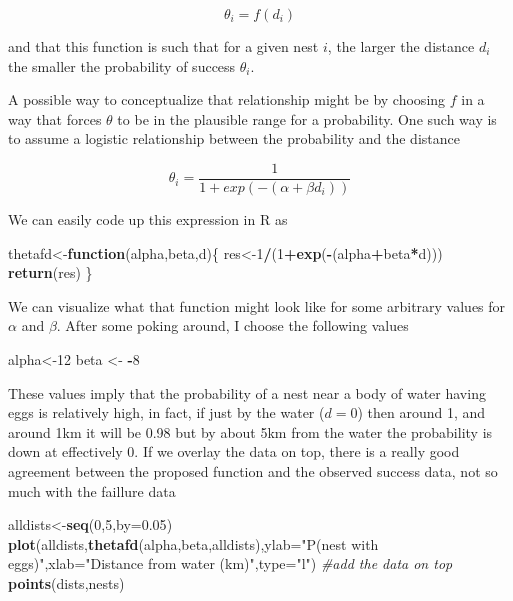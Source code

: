 \documentclass[
]{book}
\newenvironment{Shaded}{\begin{snugshade}}{\end{snugshade}}
\newcommand{\AttributeTok}[1]{\textcolor[rgb]{0.13,0.29,0.53}{#1}}
\newcommand{\CommentTok}[1]{\textcolor[rgb]{0.56,0.35,0.01}{\textit{#1}}}
\newcommand{\ControlFlowTok}[1]{\textcolor[rgb]{0.13,0.29,0.53}{\textbf{#1}}}
\newcommand{\DecValTok}[1]{\textcolor[rgb]{0.00,0.00,0.81}{#1}}
\newcommand{\FloatTok}[1]{\textcolor[rgb]{0.00,0.00,0.81}{#1}}
\newcommand{\FunctionTok}[1]{\textcolor[rgb]{0.13,0.29,0.53}{\textbf{#1}}}
\newcommand{\NormalTok}[1]{#1}
\newcommand{\OtherTok}[1]{\textcolor[rgb]{0.56,0.35,0.01}{#1}}
\newcommand{\SpecialCharTok}[1]{\textcolor[rgb]{0.81,0.36,0.00}{\textbf{#1}}}
\newcommand{\StringTok}[1]{\textcolor[rgb]{0.31,0.60,0.02}{#1}}
\begin{document}
\[\theta_i=f(d_i)\]

and that this function is such that for a given nest \(i\), the larger the distance \(d_i\) the smaller the probability of success \(\theta_i\).

A possible way to conceptualize that relationship might be by choosing \(f\) in a way that forces \(\theta\) to be in the plausible range for a probability. One such way is to assume a logistic relationship between the probability and the distance

\[\theta_i=\frac{1}{1+exp(-(\alpha+\beta d_i))}\]

We can easily code up this expression in R as

\begin{Shaded}
\begin{Highlighting}[]
\NormalTok{thetafd}\OtherTok{\textless{}{-}}\ControlFlowTok{function}\NormalTok{(alpha,beta,d)\{}
\NormalTok{  res}\OtherTok{\textless{}{-}}\DecValTok{1}\SpecialCharTok{/}\NormalTok{(}\DecValTok{1}\SpecialCharTok{+}\FunctionTok{exp}\NormalTok{(}\SpecialCharTok{{-}}\NormalTok{(alpha}\SpecialCharTok{+}\NormalTok{beta}\SpecialCharTok{*}\NormalTok{d)))}
  \FunctionTok{return}\NormalTok{(res)}
\NormalTok{\}}
\end{Highlighting}
\end{Shaded}

We can visualize what that function might look like for some arbitrary values for \(\alpha\) and \(\beta\). After some poking around, I choose the following values

\begin{Shaded}
\begin{Highlighting}[]
\NormalTok{alpha}\OtherTok{\textless{}{-}}\DecValTok{12}
\NormalTok{beta }\OtherTok{\textless{}{-}} \SpecialCharTok{{-}}\DecValTok{8}
\end{Highlighting}
\end{Shaded}

These values imply that the probability of a nest near a body of water having eggs is relatively high, in fact, if just by the water (\(d=0\)) then around 1, and around 1km it will be 0.98 but by about 5km from the water the probability is down at effectively 0. If we overlay the data on top, there is a really good agreement between the proposed function and the observed success data, not so much with the faillure data

\begin{Shaded}
\begin{Highlighting}[]
\NormalTok{alldists}\OtherTok{\textless{}{-}}\FunctionTok{seq}\NormalTok{(}\DecValTok{0}\NormalTok{,}\DecValTok{5}\NormalTok{,}\AttributeTok{by=}\FloatTok{0.05}\NormalTok{)}
\FunctionTok{plot}\NormalTok{(alldists,}\FunctionTok{thetafd}\NormalTok{(alpha,beta,alldists),}\AttributeTok{ylab=}\StringTok{"P(nest with eggs)"}\NormalTok{,}\AttributeTok{xlab=}\StringTok{"Distance from water (km)"}\NormalTok{,}\AttributeTok{type=}\StringTok{"l"}\NormalTok{)}
\CommentTok{\#add the data on top}
\FunctionTok{points}\NormalTok{(dists,nests)}
\end{Highlighting}
\end{Shaded}
\end{document}
